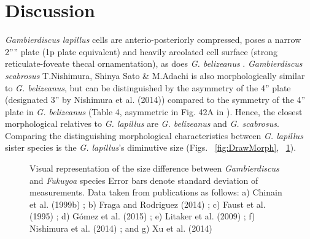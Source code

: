\documentclass[12pt]{article}
\begin{document}
\newpage
\section{Discussion}
\emph{Gambierdiscus lapillus} cells are anterio-posteriorly compressed, poses a narrow 2'''' plate (1p plate equivalent) and heavily areolated cell surface (strong reticulate-foveate thecal ornamentation), as does \emph{G. belizeanus}  \citep{litaker2009taxonomy}.
 \emph{Gambierdiscus scabrosus} T.Nishimura, Shinya Sato \& M.Adachi is also morphologically similar to \emph{G. belizeanus}, but can be distinguished by the asymmetry of the 4'' plate (designated 3'' by Nishimura et al. (2014)) compared to the symmetry of the 4'' plate in \emph{G. belizeanus} (Table 4, asymmetric in Fig. 42A in \citep{hoppenrath2014marine}). 
 Hence, the closest morphological relatives to \emph{G. lapillus} are \emph{G. belizeanus} and \emph{G. scabrosus}. 
Comparing the distinguishing morphological characteristics between \emph{G. lapillus} sister species is the \textit{G. lapillus}'s diminutive size (Figs. ~\ref{fig:DrawMorph}, ~\ref{fig:SizeGraph}).  

\FloatBarrier 
\begin{figure} 
\caption{Visual representation of the size difference between \emph{Gambierdiscus} and \textit{Fukuyoa} species Error bars denote standard deviation of measurements. Data taken from publications as follows: a) Chinain et al. (1999b) \citep{chinain1999morphology}; b) Fraga and Rodriguez (2014) \citep{fraga2014genus}; c) Faust et al. (1995) \citep{faust1995observation}; d) G\'omez et al. (2015) \citep{gomez2015fukuyoa}; e) Litaker et al. (2009) \citep{litaker2009taxonomy}; f) Nishimura et al. (2014) \citep{nishimura2014morphology}; and g) Xu et al. (2014) \citep{xu2014distribution}} 
\label{fig:SizeGraph}
\end{figure} 
\end{document}
